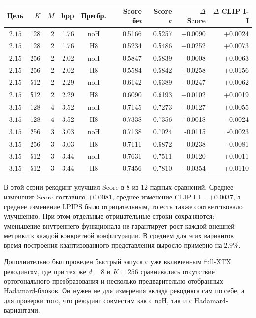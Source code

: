 \documentclass[a4paper,12pt]{article}
\begin{document}
\begin{center}
\small
\begin{tabular}{crrrcrrrr}
\hline
Цель & $K$ & $M$ & bpp & Преобр. & Score без & Score с & $\Delta$ Score & $\Delta$ CLIP I-I \\
\hline
$2.15$ & 128 & 2 & 1.76 & noH & 0.5166 & 0.5257 & +0.0090 & +0.0024 \\
$2.15$ & 128 & 2 & 1.76 & H8  & 0.5234 & 0.5486 & +0.0252 & +0.0073 \\
$2.15$ & 256 & 2 & 2.02 & noH & 0.5847 & 0.5839 & -0.0008 & +0.0063 \\
$2.15$ & 256 & 2 & 2.02 & H8  & 0.5584 & 0.5842 & +0.0258 & +0.0156 \\
$2.15$ & 512 & 2 & 2.29 & noH & 0.6142 & 0.6389 & +0.0247 & +0.0062 \\
$2.15$ & 512 & 2 & 2.29 & H8  & 0.6090 & 0.6193 & +0.0102 & +0.0019 \\
$3.15$ & 128 & 4 & 3.52 & noH & 0.7145 & 0.7273 & +0.0127 & +0.0055 \\
$3.15$ & 128 & 4 & 3.52 & H8  & 0.7338 & 0.7356 & +0.0018 & -0.0024 \\
$3.15$ & 256 & 3 & 3.03 & noH & 0.7138 & 0.7024 & -0.0115 & -0.0023 \\
$3.15$ & 256 & 3 & 3.03 & H8  & 0.7111 & 0.6872 & -0.0238 & -0.0081 \\
$3.15$ & 512 & 3 & 3.44 & noH & 0.7631 & 0.7511 & -0.0120 & +0.0011 \\
$3.15$ & 512 & 3 & 3.44 & H8  & 0.7456 & 0.7810 & +0.0354 & +0.0110 \\
\hline
\end{tabular}
\end{center}

В этой серии рекодинг улучшил Score в $8$ из $12$ парных сравнений. Среднее изменение Score составило $+0.0081$, среднее изменение CLIP I-I~- $+0.0037$, а среднее изменение LPIPS было отрицательным, то есть также соответствовало улучшению. При этом отдельные отрицательные строки сохраняются: уменьшение внутреннего функционала не гарантирует рост каждой внешней метрики в каждой конкретной конфигурации. В среднем для этих вариантов время построения квантизованного представления выросло примерно на $2.9\%$.

Дополнительно был проведен быстрый запуск с уже включенным full-XTX рекодингом, где при тех же $d=8$ и $K=256$ сравнивались отсутствие ортогонального преобразования и несколько предварительно отобранных Hadamard-блоков. Он нужен не для измерения вклада рекодинга сам по себе, а для проверки того, что рекодинг совместим как с noH, так и с Hadamard-вариантами.
\end{document}
